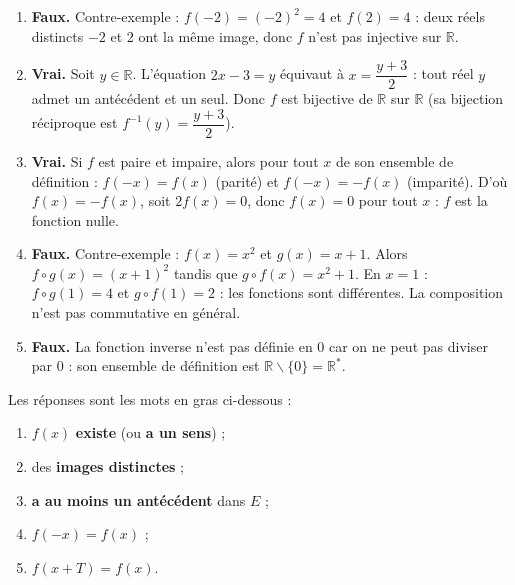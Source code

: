 \documentclass[11pt]{article}
\def\setminus{\mathbin{\backslash}}\let\smallsetminus\setminus
\begin{document}
\begin{corrige}
\begin{enumerate}
\item \textbf{Faux.} Contre-exemple : $f(-2)=(-2)^2=4$ et $f(2)=4$ : deux réels distincts $-2$ et $2$ ont la même image, donc $f$ n'est pas injective sur $\mathbb{R}$.
\item \textbf{Vrai.} Soit $y\in\mathbb{R}$. L'équation $2x-3=y$ équivaut à $x=\dfrac{y+3}{2}$ : tout réel $y$ admet un antécédent et un seul. Donc $f$ est bijective de $\mathbb{R}$ sur $\mathbb{R}$ (sa bijection réciproque est $f^{-1}(y)=\dfrac{y+3}{2}$).
\item \textbf{Vrai.} Si $f$ est paire et impaire, alors pour tout $x$ de son ensemble de définition : $f(-x)=f(x)$ (parité) et $f(-x)=-f(x)$ (imparité). D'où $f(x)=-f(x)$, soit $2f(x)=0$, donc $f(x)=0$ pour tout $x$ : $f$ est la fonction nulle.
\item \textbf{Faux.} Contre-exemple : $f(x)=x^2$ et $g(x)=x+1$. Alors $f\circ g(x)=(x+1)^2$ tandis que $g\circ f(x)=x^2+1$. En $x=1$ : $f\circ g(1)=4$ et $g\circ f(1)=2$ : les fonctions sont différentes. La composition n'est pas commutative en général.
\item \textbf{Faux.} La fonction inverse n'est pas définie en $0$ car on ne peut pas diviser par $0$ : son ensemble de définition est $\mathbb{R}\setminus\{0\}=\mathbb{R}^*$.
\end{enumerate}
\end{corrige}

\begin{corrige}
Les réponses sont les mots en gras ci-dessous :
\begin{enumerate}
\item $f(x)$ \textbf{existe} (ou \textbf{a un sens}) ;
\item des \textbf{images distinctes} ;
\item \textbf{a au moins un antécédent} dans $E$ ;
\item $f(-x)=f(x)$ ;
\item $f(x+T)=f(x)$.
\end{enumerate}
\end{corrige}
\end{document}
